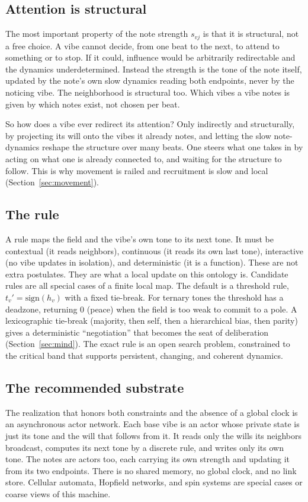 \subsection{Attention is structural}

The most important property of the note strength $s_{vj}$ is that it is structural, not a free choice. A vibe cannot decide, from one beat to the next, to attend to something or to stop. If it could, influence would be arbitrarily redirectable and the dynamics underdetermined. Instead the strength is the tone of the note itself, updated by the note's own slow dynamics reading both endpoints, never by the noticing vibe. The neighborhood is structural too. Which vibes a vibe notes is given by which notes exist, not chosen per beat.

So how does a vibe ever redirect its attention? Only indirectly and structurally, by projecting its will onto the vibes it already notes, and letting the slow note-dynamics reshape the structure over many beats. One steers what one takes in by acting on what one is already connected to, and waiting for the structure to follow. This is why movement is railed and recruitment is slow and local (Section~\ref{sec:movement}).

\subsection{The rule}

A rule maps the field and the vibe's own tone to its next tone. It must be contextual (it reads neighbors), continuous (it reads its own last tone), interactive (no vibe updates in isolation), and deterministic (it is a function). These are not extra postulates. They are what a local update on this ontology is. Candidate rules are all special cases of a finite local map. The default is a threshold rule, $t_v' = \mathrm{sign}(h_v)$ with a fixed tie-break. For ternary tones the threshold has a deadzone, returning $0$ (peace) when the field is too weak to commit to a pole. A lexicographic tie-break (majority, then self, then a hierarchical bias, then parity) gives a deterministic ``negotiation'' that becomes the seat of deliberation (Section~\ref{sec:mind}). The exact rule is an open search problem, constrained to the critical band that supports persistent, changing, and coherent dynamics.

\subsection{The recommended substrate}

The realization that honors both constraints and the absence of a global clock is an asynchronous actor network. Each base vibe is an actor whose private state is just its tone and the will that follows from it. It reads only the wills its neighbors broadcast, computes its next tone by a discrete rule, and writes only its own tone. The notes are actors too, each carrying its own strength and updating it from its two endpoints. There is no shared memory, no global clock, and no link store. Cellular automata, Hopfield networks, and spin systems are special cases or coarse views of this machine.
